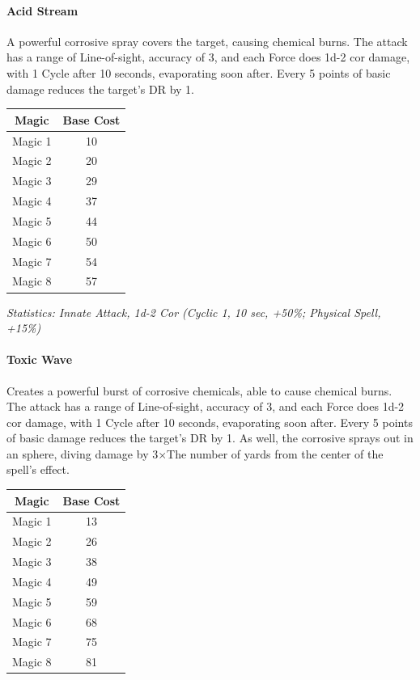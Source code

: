 \begin{multicols}{3}
	\paragraph{Acid Stream}
	
	A powerful corrosive spray covers the target, causing chemical burns. The attack has a range of Line-of-sight, accuracy of 3, and each Force does 1d-2 cor damage, with 1 Cycle after 10 seconds, evaporating soon after. Every 5 points of basic damage reduces the target's DR by 1.
	
	\begin{center}
		\begin{tabular}{|c|c|}
			\hline
			Magic & Base Cost \\
			\hline
			\hline
			Magic 1 & 10 \\
			Magic 2 & 20 \\
			Magic 3 & 29 \\
			Magic 4 & 37 \\
			Magic 5 & 44 \\
			Magic 6 & 50 \\
			Magic 7 & 54 \\
			Magic 8 & 57 \\
			\hline
		\end{tabular}
	\end{center}
	
	\textcolor{OliveGreen}{\textit{Statistics: Innate Attack, 1d-2 Cor (Cyclic 1, 10 sec, +50\%; Physical Spell, +15\%)}}
	
	\paragraph{Toxic Wave}
	
	Creates a powerful burst of corrosive chemicals, able to cause chemical burns. The attack has a range of Line-of-sight, accuracy of 3, and each Force does 1d-2 cor damage, with 1 Cycle after 10 seconds, evaporating soon after. Every 5 points of basic damage reduces the target's DR by 1. As well, the corrosive sprays out in an sphere, diving damage by 3\(\times\)The number of yards from the center of the spell's effect. 
	
	\begin{center}
		\begin{tabular}{|c|c|}
			\hline
			Magic & Base Cost \\
			\hline
			\hline
			Magic 1 & 13 \\
			Magic 2 & 26 \\
			Magic 3 & 38 \\
			Magic 4 & 49 \\
			Magic 5 & 59 \\
			Magic 6 & 68 \\
			Magic 7 & 75 \\
			Magic 8 & 81 \\
			\hline
		\end{tabular}
	\end{center}
	

\end{multicols}
